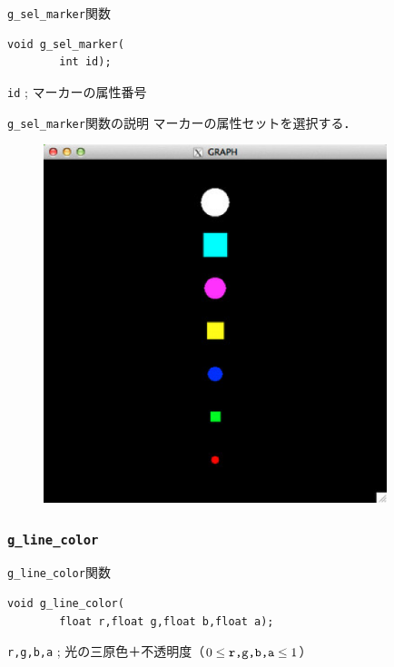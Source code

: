 \documentclass[a4paper,12pt]{jsarticle}%
\begin{document}
\begin{itembox}[l]{\texttt{g\_sel\_marker}関数}
\begin{verbatim}
void g_sel_marker(
        int id);
\end{verbatim}
\verb|id| ; マーカーの属性番号\\
\end{itembox}

\begin{itembox}[l]{\texttt{g\_sel\_marker}関数の説明}
マーカーの属性セットを選択する．
\end{itembox}

\begin{figure}[htb]
	\includegraphics[width=100mm]{./Figures/eps/Canvas_g_marker.eps}
\end{figure}


\clearpage
\subsubsection{\texttt{g\_line\_color}}

\begin{itembox}[l]{\texttt{g\_line\_color}関数}
\begin{verbatim}
void g_line_color(
        float r,float g,float b,float a);
\end{verbatim}
\verb|r,g,b,a| ; 光の三原色＋不透明度（$0\leq \verb|r,g,b,a| \leq 1$）\\
\end{itembox}
\end{document}
